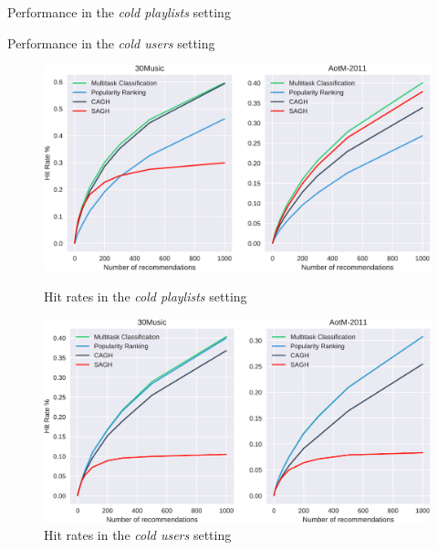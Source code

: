 \begin{table}[!t]
    \centering
    \begin{minipage}{.5\textwidth}
        \centering
        \caption{Performance in the \emph{cold playlists} setting}
        \label{tab:perf1}
        \resizebox{.95\textwidth}{!}{
        
        }
    \end{minipage}%
    \begin{minipage}{0.5\textwidth}
        \centering
        \caption{Performance in the \emph{cold users} setting}
        \label{tab:perf2}
        \resizebox{.95\textwidth}{!}{
        
        }
    \end{minipage}
\end{table}


\begin{figure}[t]
    \centering
    \begin{minipage}{.5\textwidth}
        \centering
        \includegraphics[width=.925\linewidth]{fig/hitrate1.pdf}
        \caption{Hit rates in the \emph{cold playlists} setting}
        \label{fig:hr1}
    \end{minipage}%
    \begin{minipage}{0.5\textwidth}
        \centering
        \includegraphics[width=.925\linewidth]{fig/hitrate2.pdf}
        \caption{Hit rates in the \emph{cold users} setting}
        \label{fig:hr2}
    \end{minipage}
\end{figure}



